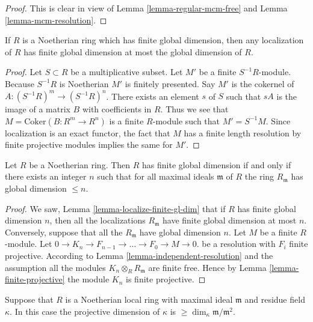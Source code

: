 \begin{proof}
This is clear in view of Lemma \ref{lemma-regular-mcm-free}
and Lemma \ref{lemma-mcm-resolution}.
\end{proof}

\begin{lemma}
\label{lemma-localize-finite-gl-dim}
If $R$ is a Noetherian ring which has finite global dimension,
then any localization of $R$ has finite global dimension
at most the global dimension of $R$.
\end{lemma}

\begin{proof}
Let $S \subset R$ be a multiplicative subset.
Let $M'$ be a finite $S^{-1}R$-module.
Because $S^{-1}R$ is Noetherian $M'$ is finitely presented.
Say $M'$ is the cokernel of $A : (S^{-1}R)^m
\to (S^{-1}R)^n$. There exists an element $s$ of $S$ such
that $sA$ is the image of a matrix $B$ with coefficients in $R$.
Thus we see that $M = \text{Coker}(B : R^m \to R^n)$
is a finite $R$-module such that $M' = S^{-1}M$.
Since localization is an exact functor, the fact that
$M$ has a finite length resolution by finite projective
modules implies the same for $M'$.
\end{proof}

\begin{lemma}
\label{lemma-finite-gl-dim-primes}
Let $R$ be a Noetherian ring.
Then $R$ has finite global dimension if and
only if there exists an integer $n$ such that
for all maximal ideals $\mathfrak m$ of $R$
the ring $R_{\mathfrak m}$ has global dimension
$\leq n$.
\end{lemma}

\begin{proof}
We saw, Lemma \ref{lemma-localize-finite-gl-dim}
that if $R$ has finite global dimension $n$,
then all the localizations $R_{\mathfrak m}$
have finite global dimension at most $n$.
Conversely, suppose that all the $R_{\mathfrak m}$
have global dimension $n$. Let $M$ be a finite
$R$-module. Let
$0 \to K_n \to F_{n-1} \to \ldots \to F_0 \to M\to 0$.
be a resolution with $F_i$ finite projective.
According to Lemma \ref{lemma-independent-resolution}
and the assumption all the modules $K_n \otimes_R R_{\mathfrak m}$
are finite free. Hence by Lemma \ref{lemma-finite-projective}
the module $K_n$ is finite projective.
\end{proof}

\begin{lemma}
\label{lemma-length-resolution-residue-field}
Suppose that $R$ is a Noetherian local ring
with maximal ideal $\mathfrak m$ and
residue field $\kappa$. In this case
the projective dimension of $\kappa$ is
$\geq \dim_\kappa \mathfrak m / \mathfrak m^2$.
\end{lemma}

